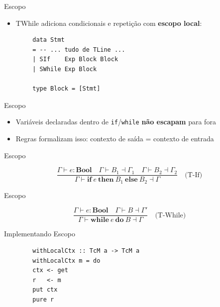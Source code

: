 \begin{frame}[fragile]{Escopo}

    \begin{itemize}

        \item
        TWhile adiciona condicionais e repetição com \textbf{escopo local}:
    \end{itemize}

    \begin{lstlisting}
        data Stmt
        = -- ... tudo de TLine ...
        | SIf    Exp Block Block
        | SWhile Exp Block

        type Block = [Stmt]
    \end{lstlisting}
\end{frame}

\begin{frame}[fragile]{Escopo}

    \begin{itemize}

        \item
        Variáveis declaradas dentro de
        \texttt{if}/\texttt{while}
        \textbf{não escapam} para fora
        \item
        Regras formalizam isso: contexto de saída = contexto de entrada
    \end{itemize}
\end{frame}

\begin{frame}{Escopo}

    \[\frac{\Gamma \vdash e : \mathbf{Bool} \quad \Gamma \vdash B_1 \dashv \Gamma_1 \quad \Gamma \vdash B_2 \dashv \Gamma_2}{\Gamma \vdash \mathbf{if}\ e\ \mathbf{then}\ B_1\ \mathbf{else}\ B_2 \dashv \Gamma} \quad\text{(T-If)}\]
\end{frame}

\begin{frame}{Escopo}

    \[\frac{\Gamma \vdash e : \mathbf{Bool} \quad \Gamma \vdash B \dashv \Gamma'}{\Gamma \vdash \mathbf{while}\ e\ \mathbf{do}\ B \dashv \Gamma} \quad\text{(T-While)}\]
\end{frame}

\begin{frame}[fragile]{Implementando Escopo}

    \begin{lstlisting}
        withLocalCtx :: TcM a -> TcM a
        withLocalCtx m = do
        ctx <- get
        r   <- m
        put ctx
        pure r
    \end{lstlisting}
\end{frame}

